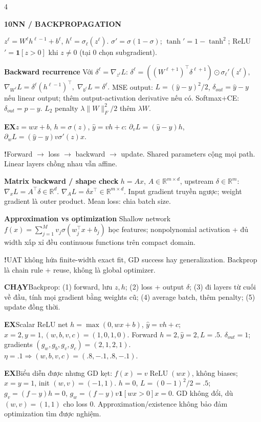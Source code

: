 \documentclass[a4paper]{article}
\newcommand{\topic}[2]{\par\addvspace{.8pt}%
  \begingroup\setlength{\fboxsep}{0.5pt}%
  \noindent\colorbox{structure}{\parbox{\dimexpr\linewidth-2\fboxsep\relax}{%
    \color{white}\fontsize{6.5}{7.1}\selectfont\bfseries #1\enspace #2}}%
  \endgroup\par\nobreak\vspace{.3pt}\nobreak}
\newcommand{\run}[1]{\key{CHẠY}#1}
\newcommand{\key}[1]{\par\textcolor{structure}{\textbf{#1}}\enspace}
\newcommand{\note}[4]{\par\begingroup\setlength{\fboxsep}{0.15pt}%
  \noindent\colorbox{#1}{\parbox{\dimexpr\linewidth-2\fboxsep\relax}{%
    \RaggedRight\textcolor{#2}{\textbf{#3}}\enspace #4}}%
  \endgroup\par}
\newcommand{\trap}[1]{\note{warningbg}{warning}{!}{#1}}
\newcommand{\ex}[1]{\note{examplebg}{example}{EX}{#1}}
\newcommand{\R}{\mathbb{R}}
\newcommand{\norm}[1]{\lVert#1\rVert}
\newcommand{\ind}{\mathbf1}
\begin{document}
\begin{multicols*}{4}
\topic{10}{NN / BACKPROPAGATION}
$z^\ell=W^\ell h^{\ell-1}+b^\ell$, $h^\ell=\sigma_\ell(z^\ell)$.
$\sigma'=\sigma(1-\sigma)$; $\tanh'=1-\tanh^2$; ReLU$'=\ind[z>0]$ khi $z\ne0$ (tại $0$ chọn subgradient).
\key{Backward recurrence}
Với $\delta^\ell=\nabla_{z^\ell}L$:
$\delta^\ell=((W^{\ell+1})^\top\delta^{\ell+1})\odot\sigma_\ell'(z^\ell),$ $ \nabla_{W^\ell}L=\delta^\ell(h^{\ell-1})^\top,\;\nabla_{b^\ell}L=\delta^\ell.$
MSE output: $L=(\hat y-y)^2/2$, $\delta_{out}=\hat y-y$ nếu linear output; thêm output-activation derivative nếu có. Softmax+CE: $\delta_{out}=p-y$.
$L_2$ penalty $\lambda\norm W_F^2/2$ thêm $\lambda W$.
\ex{$z=wx+b$, $h=\sigma(z)$, $\hat y=vh+c$: $\partial_vL=(\hat y-y)h$, $\partial_wL=(\hat y-y)v\sigma'(z)x$.}
\trap{Forward $\to$ loss $\to$ backward $\to$ update. Shared parameters cộng mọi path. Linear layers chồng nhau vẫn affine.}
\key{Matrix backward / shape check}
$h=Ax$, $A\in\R^{m\times d}$, upstream $\delta\in\R^m$:
$\nabla_xL=A^\top\delta\in\R^d.$
$\nabla_AL=\delta x^\top\in\R^{m\times d}.$
Input gradient truyền ngược; weight gradient là outer product. Mean loss: chia batch size.
\key{Approximation vs optimization}
Shallow network $f(x)=\sum_{j=1}^M v_j\sigma(w_j^\top x+b_j)$ học features; nonpolynomial activation + đủ width xấp xỉ đều continuous functions trên compact domain.
\trap{UAT không hứa finite-width exact fit, GD success hay generalization. Backprop là chain rule + reuse, không là global optimizer.}
\run{Backprop: (1) forward, lưu $z,h$; (2) loss + output $\delta$; (3) đi layers từ cuối về đầu, tính mọi gradient bằng weights cũ; (4) average batch, thêm penalty; (5) update đồng thời.}
\ex{Scalar ReLU net $h=\max(0,wx+b)$, $\hat y=vh+c$; $x=2,y=1,(w,b,v,c)=(1,0,1,0)$. Forward $h=2,\hat y=2,L=.5$. $\delta_{out}=1$; gradients $(g_w,g_b,g_v,g_c)=(2,1,2,1)$. $\eta=.1\Rightarrow(w,b,v,c)=(.8,-.1,.8,-.1)$.}
\ex{Biểu diễn được nhưng GD kẹt: $f(x)=v\operatorname{ReLU}(wx)$, không biases; $x=y=1$, init $(w,v)=(-1,1)$. $h=0$, $L=(0-1)^2/2=.5$; $g_v=(f-y)h=0$, $g_w=(f-y)v\ind[wx>0]x=0$. GD không đổi, dù $(w,v)=(1,1)$ cho loss $0$. Approximation/existence không bảo đảm optimization tìm được nghiệm.}


\end{multicols*}
\end{document}
